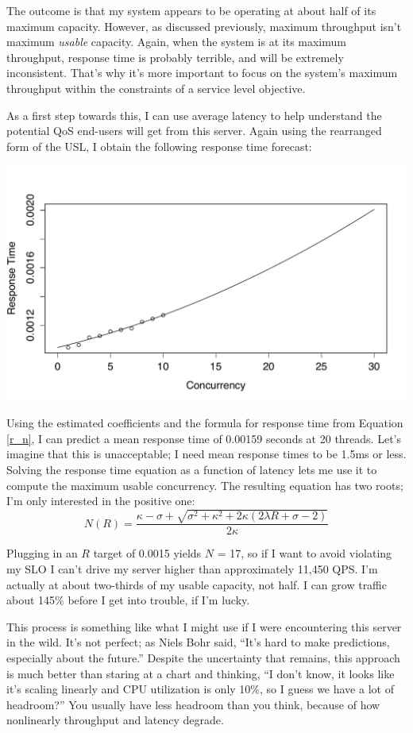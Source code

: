 \documentclass{vivid_layout}
\begin{document}
The outcome is that my system appears to be operating at about half of its
maximum capacity. However, as discussed previously, maximum throughput isn't
maximum {\itshape usable} capacity. Again, when the system is at its maximum
throughput, response time is probably terrible, and will be extremely
inconsistent. That's why it's more important to focus on the system's maximum
throughput within the constraints of a service level objective.

As a first step towards this, I can use average latency to help understand the
potential QoS end-users will get from this server. Again using the rearranged
form of the USL, I obtain the following response time forecast:
\begin{center}
\includegraphics[width=.85\linewidth]{scalability/cisco-3}
\end{center}

Using the estimated coefficients and the formula for response time from Equation
\ref{r_n}, I can predict a mean response time
of 0.00159 seconds at 20 threads. Let's imagine that this is unacceptable; I
need mean response times to be 1.5ms or less. Solving the response time equation
as a function of latency lets me use it to compute the maximum usable
concurrency. The resulting equation has two roots; I'm only interested in the
positive one:
\begin{equation}
N(R)=\frac{\kappa-\sigma+\sqrt{\sigma^2+\kappa^2+2\kappa(2\lambda R+\sigma-2)}} {2\kappa}
\label{n_r}
\end{equation}

Plugging in an $R$ target of 0.0015 yields $N$ = 17, so if I want to avoid
violating my SLO I can't drive my server higher than approximately 11,450 QPS.
I'm actually at about two-thirds of my usable capacity, not half. I can grow
traffic about 145\% before I get into trouble, if I'm lucky.

This process is something like what I might use if I were encountering this
server in the wild. It's not perfect; as Niels Bohr said, ``It's hard to make
predictions, especially about the future.'' Despite the uncertainty that
remains, this approach is much better than staring at a chart and thinking, ``I
don't know, it looks like it's scaling linearly and CPU utilization is only
10\%, so I guess we have a lot of headroom?'' You usually have less headroom
than you think, because of how nonlinearly throughput and latency degrade.
\end{document}
